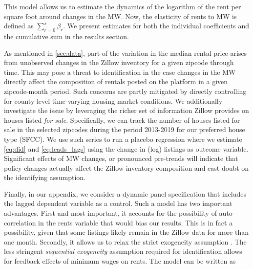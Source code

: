 This model allows us to estimate the dynamics of the logarithm of the rent per square foot 
around changes in the MW. Now, the elasticity of rents to MW is defined as $\sum_{r=0}^s 
\beta_r$. We present estimates for both the individual coefficients and the cumulative sum 
in the results section. 



As mentioned in \autoref{sec:data}, part of the variation in the median rental price arises 
from unobserved changes in the Zillow inventory for a given zipcode through time. This may 
pose a threat to identification in the case changes in the MW directly affect the composition 
of rentals posted on the platform in a given zipcode-month period. Such concerns are partly 
mitigated by directly controlling for county-level time-varying housing market conditions. We 
additionally investigate the issue by leveraging the richer set of information Zillow provides 
on houses listed \textit{for sale}. Specifically, we can track the number of houses listed for 
sale in the selected zipcodes during the period 2013-2019 for our preferred house type (SFCC). 
We use such series to run a placebo regression where we estimate \autoref{eq:did} and 
\autoref{eq:leads_lags} using the change in (log) listings as outcome variable. Significant 
effects of MW changes, or pronounced pre-trends will indicate that policy changes actually 
affect the Zillow inventory composition and cast doubt on the identifying assumption.

Finally, in our appendix, we consider a dynamic panel specification that includes the lagged
dependent variable as a control. Such a model has two important advantages. First and most 
important, it accounts for the possibility of auto-correlation in the rents variable that 
would bias our results. This is in fact a possibility, given that some listings likely remain 
in the Zillow data for more than one month. Secondly, it allows us to relax the strict 
exogeneity assumption \parencite{ArellanoHonore2001}. The less stringent \textit{sequential 
exogeneity} assumption required for identification allows for feedback effects of minimum wages 
on rents. The model can be written as

